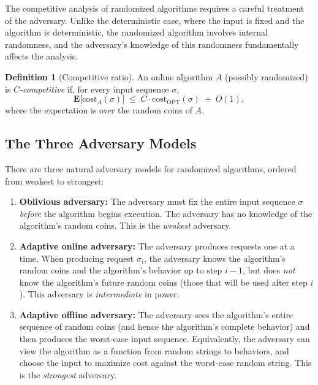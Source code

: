 \documentclass[twoside,12pt]{book}
\theoremstyle{plain}
\theoremstyle{definition}
\newtheorem{definition}[theorem]{Definition}
\theoremstyle{remark}
\begin{document}
The competitive analysis of randomized algorithms requires a careful
treatment of the adversary.  Unlike the deterministic case, where the
input is fixed and the algorithm is deterministic, the randomized
algorithm involves internal randomness, and the adversary's knowledge
of this randomness fundamentally affects the analysis.

\begin{definition}[Competitive ratio]
An online algorithm $A$ (possibly randomized) is
\emph{$C$-competitive} if, for every input sequence $\sigma$,
\[
  \mathbf{E}\!\bigl[\mathrm{cost}_A(\sigma)\bigr] \;\le\; C \cdot \mathrm{cost}_{\mathrm{OPT}}(\sigma) \;+\; O(1),
\]
where the expectation is over the random coins of $A$.
\end{definition}

\subsection{The Three Adversary Models}

There are three natural adversary models for randomized algorithms,
ordered from weakest to strongest:

\begin{enumerate}[nosep]
  \item \textbf{Oblivious adversary:} The adversary must fix the entire
        input sequence $\sigma$ \emph{before} the algorithm begins
        execution.  The adversary has no knowledge of the algorithm's
        random coins.  This is the \emph{weakest} adversary.

  \item \textbf{Adaptive online adversary:} The adversary produces
        requests one at a time.  When producing request $\sigma_i$, the
        adversary knows the algorithm's random coins and the algorithm's
        behavior up to step $i-1$, but does \emph{not} know the
        algorithm's future random coins (those that will be used after
        step $i$).  This adversary is \emph{intermediate} in power.

  \item \textbf{Adaptive offline adversary:} The adversary sees the
        algorithm's entire sequence of random coins (and hence the
        algorithm's complete behavior) and then produces the worst-case
        input sequence.  Equivalently, the adversary can view the
        algorithm as a function from random strings to behaviors, and
        choose the input to maximize cost against the worst-case random
        string.  This is the \emph{strongest} adversary.
\end{enumerate}
\end{document}
